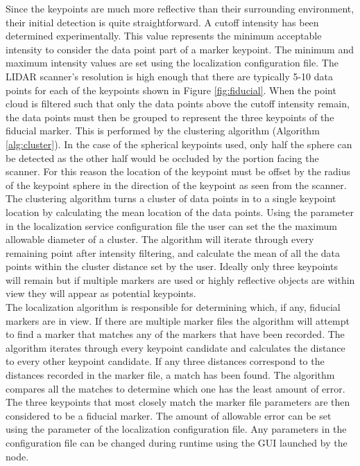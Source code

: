 Since the keypoints are much more reflective than their surrounding environment, their initial detection is quite straightforward. A cutoff intensity has been determined experimentally. This value represents the minimum acceptable intensity to consider the data point part of a marker keypoint. The minimum and maximum intensity values are set using the localization configuration file. The LIDAR scanner's resolution is high enough that there are typically 5-10 data points for each of the keypoints shown in Figure \ref{fig:fiducial}. When the point cloud is filtered such that only the data points above the cutoff intensity remain, the data points must then be grouped to represent the three keypoints of the fiducial marker. This is performed by the clustering algorithm (Algorithm \ref{alg:cluster}). In the case of the spherical keypoints used, only half the sphere can be detected as the other half would be occluded by the portion facing the scanner. For this reason the location of the keypoint must be offset by the radius of the keypoint sphere in the direction of the keypoint as seen from the scanner.\\

The clustering algorithm turns a cluster of data points in to a single keypoint location by calculating the mean location of the data points. Using the  parameter in the localization service configuration file the user can set the the maximum allowable diameter of a cluster. The algorithm will iterate through every remaining point after intensity filtering, and calculate the mean of all the data points within the cluster distance set by the user. Ideally only three keypoints will remain but if multiple markers are used or highly reflective objects are within view they will appear as potential keypoints.\\

The localization algorithm is responsible for determining which, if any, fiducial markers are in view. If there are multiple marker files the algorithm will attempt to find a marker that matches any of the markers that have been recorded. The algorithm iterates through every keypoint candidate and calculates the distance to every other keypoint candidate. If any three distances correspond to the distances recorded in the marker file, a match has been found. The algorithm compares all the matches to determine which one has the least amount of error. The three keypoints that most closely match the marker file parameters are then considered to be a fiducial marker. The amount of allowable error can be set using the  parameter of the localization configuration file. Any parameters in the configuration file can be changed during runtime using the GUI launched by the  node.\\

